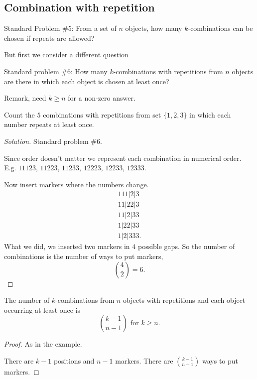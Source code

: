 \documentclass[10pt, a4paper]{article}
\begin{document}
\subsection{Combination with repetition}
Standard Problem \#5: From a set of $n$ objects,
how many $k$-combinations can be chosen if repeats are allowed?

But first we consider a different question

Standard problem \#6: How many $k$-combinations with repetitions from $n$ objects are there in which each object is chosen at least once?

Remark, need $k \geq n$ for a non-zero answer.

\begin{example}
    Count the $5$ combinations with repetitions from set $\{1, 2, 3\}$ in which each number repeats at least once.
    \begin{proof}[Solution]\renewcommand{\qedsymbol}{}
        Standard problem \#6.

        Since order doesn't matter we represent each combination in numerical order.
        E.g. $11123$, $11223$, $11233$, $12223$, $12233$, $12333$.

        Now insert markers where the numbers change.
        \begin{align*}
            111|2|3 \\
            11|22|3 \\
            11|2|33 \\
            1|22|33 \\
            1|2|333.
        \end{align*}
        What we did, we inserted two markers in $4$ possible gaps.
        So the number of combinations is the number of ways to put markers,
        \[
        \binom{4}{2} = 6.
        \]
    \end{proof}
\end{example}

\begin{theorem}\label{disc:thm:kcombwrep}
    The number of $k$-combinations from $n$ objects with repetitions and each object occurring at least once is
    \[
    \binom{k - 1}{n - 1}\text{ for } k \geq n.
    \]
    \begin{proof}
        As in the example.

        There are $k - 1$ positions and $n - 1$ markers.
        There are $\binom{k - 1}{n - 1}$ ways to put markers.
    \end{proof}
\end{theorem}
\end{document}
